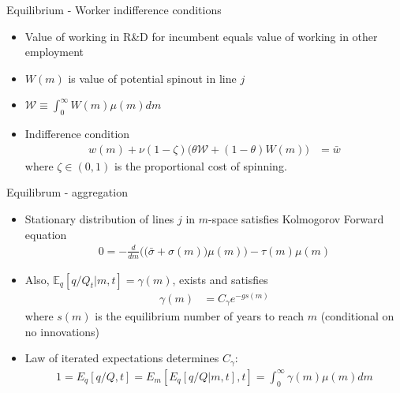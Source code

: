 \documentclass[english,usenames,dvipsnames]{beamer}
\begin{document}
\begin{frame}{Equilibrium - Worker indifference conditions}
\begin{itemize}
	\item Value of working in R\&D for incumbent equals value of working in other employment
	\item $W(m)$ is value of potential spinout in line $j$
	\item $\mathcal{W} \equiv \int_0^\infty W(m) \mu(m) dm$  
	\item Indifference condition
	\small
	\begin{align*}
	w(m) + \nu (1-\zeta) \Big(\theta \mathcal{W} + (1-\theta) W(m) \Big) &= \bar{w}
	\end{align*}
	where $\zeta \in (0,1)$ is the proportional cost of spinning.
\end{itemize}
\end{frame}

\begin{frame}{Equilibrum - aggregation}
\begin{itemize}
	\item Stationary distribution of lines $j$ in $m$-space satisfies Kolmogorov Forward equation
	\begin{align*}
		0 = -\frac{d}{dm} \Big( \big(\bar{\sigma} + \sigma(m) \big)\mu(m) \Big) - \tau(m) \mu(m) 
	\end{align*}
	\item Also,  $\mathbb{E}_{q}[q/Q_t|m,t] = \gamma(m)$, exists and satisfies
	\begin{align*}
		\gamma(m) &= C_{\gamma} e^{-g s(m)}
	\end{align*}
	where $s(m)$ is the equilibrium number of years to reach $m$ (conditional on no innovations)
	\item Law of iterated expectations determines $C_{\gamma}$: 
	\begin{align*}
		1 = E_{q}[q/Q,t] = E_m[ E_{q}[q/Q|m,t] ,t] = \int_0^{\infty} \gamma(m) \mu(m) dm
	\end{align*}
\end{itemize}
\end{frame}
\end{document}
